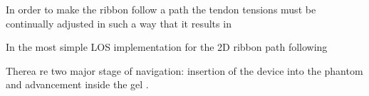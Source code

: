 
In order to make the ribbon follow a path the tendon tensions must be continually adjusted in such a way that it results in 

In the most simple LOS implementation for the 2D ribbon path following 

Therea re two major stage of navigation: insertion of the device into the phantom and advancement inside the gel \cite{noseda_flat_2024}. 
